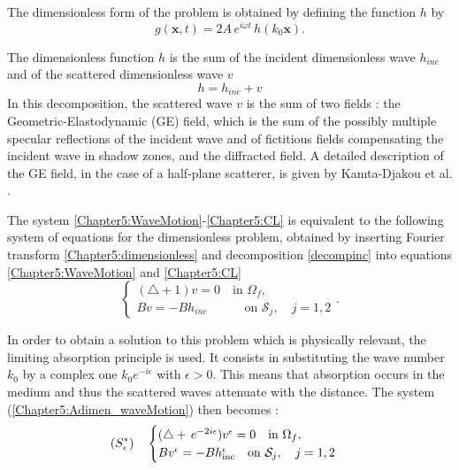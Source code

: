 The dimensionless form of the problem is obtained  by defining the function $h$ by
\begin{equation}
\label{Chapter5:dimensionless}
g(\mathbf{x},t) = 2A \, e^{i \omega t} \, h(k_0 \mathbf{x}).  
\end{equation}

The dimensionless function $h$ is the sum of the  incident dimensionless  wave $h_{inc}$ and of the scattered dimensionless  wave $v$
\begin{equation}
h = h_{inc} + v
\label{decompinc}
\end{equation}
In this decomposition, the scattered wave $v$ is the sum of two fields : the Geometric-Elastodynamic (GE) field, which  is the sum of the possibly multiple specular reflections of the incident wave and of fictitious fields compensating the incident wave in shadow zones, and the diffracted field. A detailed description of the GE field, in the case of a half-plane scatterer, is given by Kamta-Djakou et al. \cite{Audrey}.

The system \eqref{Chapter5:WaveMotion}-\eqref{Chapter5:CL} is equivalent to the following  system of equations for the dimensionless problem, obtained by inserting Fourier transform \eqref{Chapter5:dimensionless} and decomposition \eqref{decompinc} into equations \eqref{Chapter5:WaveMotion} and \eqref{Chapter5:CL}
\begin{equation}
\label{Chapter5:Adimen_waveMotion}
\begin{cases}
(\triangle+1)v =  0 \quad \text{in } \Omega_f, \\
Bv =  -Bh_{inc} \quad \quad \quad \text{on } \mathcal{S}_j, \quad j=1,2
\end{cases}.
\end{equation}

In order to obtain a solution to this problem which is physically relevant, the limiting absorption principle is used. It consists in substituting the wave number $k_0$ by a complex one $k_0 e^{-i\epsilon} $ with $\epsilon > 0$. This means that absorption occurs in the medium and thus the scattered waves attenuate with the distance. The system (\ref{Chapter5:Adimen_waveMotion}) then becomes :
\begin{equation}
\label{Chapter5:waveMotion_epsilon}
(S_\epsilon^*) \quad
\begin{cases}
(\triangle+ \, e^{-2i\epsilon}) v^\epsilon  =  0 \quad \text{in } \Omega_f, \\
Bv^\epsilon  =  -Bh_{\rm inc}^\epsilon  \quad \text{on } \mathcal{S}_j, \quad j=1,2
\end{cases}
\end{equation}


